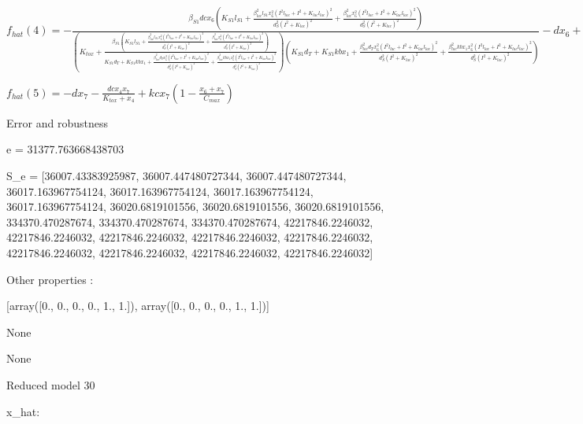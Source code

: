 $f_{hat}(4)=- \frac{\beta_{S1} dc x_{6} \left(K_{S1} l_{S1} + \frac{\beta_{lac}^{2} l_{S1} x_{6}^{2} \left(I^{2} l_{lac} + I^{2} + K_{lac} l_{lac}\right)^{2}}{d_{S}^{2} \left(I^{2} + K_{lac}\right)^{2}} + \frac{\beta_{lac}^{2} x_{6}^{2} \left(I^{2} l_{lac} + I^{2} + K_{lac} l_{lac}\right)^{2}}{d_{S}^{2} \left(I^{2} + K_{lac}\right)^{2}}\right)}{\left(K_{tox} + \frac{\beta_{S1} \left(K_{S1} l_{S1} + \frac{\beta_{lac}^{2} l_{S1} x_{6}^{2} \left(I^{2} l_{lac} + I^{2} + K_{lac} l_{lac}\right)^{2}}{d_{S}^{2} \left(I^{2} + K_{lac}\right)^{2}} + \frac{\beta_{lac}^{2} x_{6}^{2} \left(I^{2} l_{lac} + I^{2} + K_{lac} l_{lac}\right)^{2}}{d_{S}^{2} \left(I^{2} + K_{lac}\right)^{2}}\right)}{K_{S1} d_{T} + K_{S1} kb x_{1} + \frac{\beta_{lac}^{2} d_{T} x_{6}^{2} \left(I^{2} l_{lac} + I^{2} + K_{lac} l_{lac}\right)^{2}}{d_{S}^{2} \left(I^{2} + K_{lac}\right)^{2}} + \frac{\beta_{lac}^{2} kb x_{1} x_{6}^{2} \left(I^{2} l_{lac} + I^{2} + K_{lac} l_{lac}\right)^{2}}{d_{S}^{2} \left(I^{2} + K_{lac}\right)^{2}}}\right) \left(K_{S1} d_{T} + K_{S1} kb x_{1} + \frac{\beta_{lac}^{2} d_{T} x_{6}^{2} \left(I^{2} l_{lac} + I^{2} + K_{lac} l_{lac}\right)^{2}}{d_{S}^{2} \left(I^{2} + K_{lac}\right)^{2}} + \frac{\beta_{lac}^{2} kb x_{1} x_{6}^{2} \left(I^{2} l_{lac} + I^{2} + K_{lac} l_{lac}\right)^{2}}{d_{S}^{2} \left(I^{2} + K_{lac}\right)^{2}}\right)} - d x_{6} + kc x_{6} \left(1 - \frac{x_{6} + x_{7}}{C_{max}}\right)$


$f_{hat}(5)=- d x_{7} - \frac{dc x_{4} x_{7}}{K_{tox} + x_{4}} + kc x_{7} \left(1 - \frac{x_{6} + x_{7}}{C_{max}}\right)$



Error and robustness 


e = 31377.763668438703

S_e = [36007.43383925987, 36007.447480727344, 36007.447480727344, 36017.163967754124, 36017.163967754124, 36017.163967754124, 36017.163967754124, 36020.6819101556, 36020.6819101556, 36020.6819101556, 334370.470287674, 334370.470287674, 334370.470287674, 42217846.2246032, 42217846.2246032, 42217846.2246032, 42217846.2246032, 42217846.2246032, 42217846.2246032, 42217846.2246032, 42217846.2246032, 42217846.2246032]

Other properties :


[array([0., 0., 0., 0., 1., 1.]), array([0., 0., 0., 0., 1., 1.])]

None

None

Reduced model 30

x_{hat}: 

